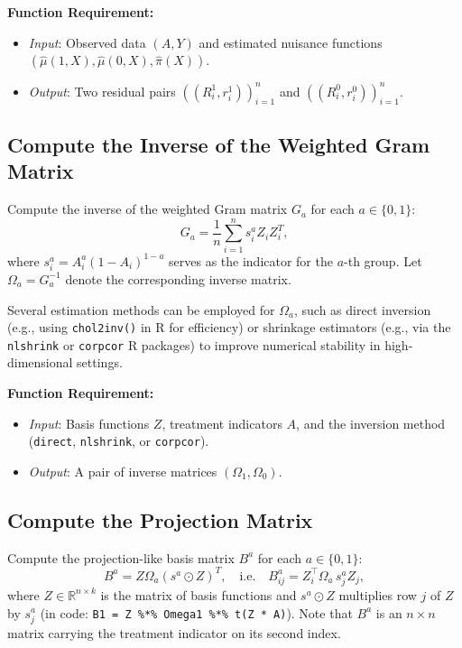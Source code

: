 \documentclass[12pt]{article}
\begin{document}
\textbf{Function Requirement:}
\begin{itemize}
  \item \textit{Input}: Observed data $(A, Y)$ and estimated nuisance functions $(\hat{\mu}(1,X), \hat{\mu}(0,X), \hat{\pi}(X))$.
  \item \textit{Output}: Two residual pairs $((R_i^1, r_i^1))_{i=1}^n$ and $((R_i^0, r_i^0))_{i=1}^n$.
\end{itemize}

\subsection{Compute the Inverse of the Weighted Gram Matrix}

Compute the inverse of the weighted Gram matrix $G_a$ for each $a \in \{0,1\}$:
\begin{equation}
G_a = \frac{1}{n} \sum_{i=1}^{n} s_i^a Z_i Z_i^T,
\end{equation}
where $s_i^a = A_i^a (1 - A_i)^{1-a}$ serves as the indicator for the $a$-th group. Let $\Omega_a = G_a^{-1}$ denote the corresponding inverse matrix.

Several estimation methods can be employed for $\Omega_a$, such as direct inversion (e.g., using \texttt{chol2inv()} in R for efficiency) or shrinkage estimators (e.g., via the \texttt{nlshrink} or \texttt{corpcor} R packages) to improve numerical stability in high-dimensional settings.

\textbf{Function Requirement:}
\begin{itemize}
  \item \textit{Input}: Basis functions $Z$, treatment indicators $A$, and the inversion method (\texttt{direct}, \texttt{nlshrink}, or \texttt{corpcor}).
  \item \textit{Output}: A pair of inverse matrices $(\Omega_1, \Omega_0)$.
\end{itemize}

\subsection{Compute the Projection Matrix}

Compute the projection-like basis matrix $B^a$ for each $a \in \{0,1\}$:
\begin{equation}
B^a = Z \Omega_a (s^a \odot Z)^T, \quad \text{i.e.} \quad B^a_{ij} = Z_i^\top \Omega_a\, s^a_j Z_j,
\end{equation}
where $Z \in \mathbb{R}^{n \times k}$ is the matrix of basis functions and $s^a \odot Z$ multiplies row $j$ of $Z$ by $s^a_j$ (in code: \texttt{B1 = Z \%*\% Omega1 \%*\% t(Z * A)}). Note that $B^a$ is an $n \times n$ matrix carrying the treatment indicator on its second index.
\end{document}
